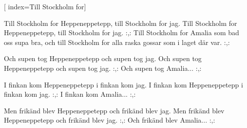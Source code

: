 [ 						
	index={Till Stockholm for}]		
	
\beginverse*						
Till Stockholm for Heppeneppetepp, 
till Stockholm for jag.
Till Stockholm for Heppeneppetepp,
till Stockholm for jag.
\endverse	
\beginchorus
:,: Till Stockholm for Amalia
som bad oss supa bra, 
och till Stockholm for alla raska gossar
som i laget där var. :,:
\endchorus		

\beginverse				
Och supen tog Heppeneppetepp
och supen tog jag.
Och supen tog Heppeneppetepp
och supen tog jag.
\endverse	
\beginchorus
:,: Och supen tog Amalia... :,:
\endchorus	

\beginverse
I finkan kom Heppeneppetepp
i finkan kom jag. 
I finkan kom Heppeneppetepp
i finkan kom jag.
\endverse	
\beginchorus
:,: I finkan kom Amalia... :,:
\endchorus

\beginverse
Men frikänd blev Heppeneppetepp
och frikänd blev jag. 
Men frikänd blev Heppeneppetepp
och frikänd blev jag. 
\endverse	
\beginchorus
:,: Och frikänd blev Amalia... :,:
\endchorus	
\endsong		
